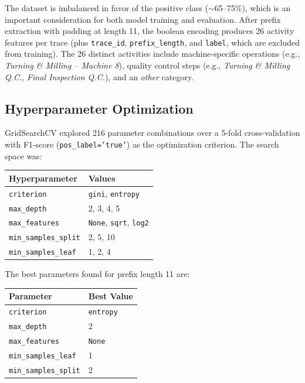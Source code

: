 \documentclass{article}
\begin{document}
\noindent
The dataset is imbalanced in favor of the positive class ($\sim$65--75\%), which is an important consideration for both model training and evaluation. After prefix extraction with padding at length 11, the boolean encoding produces 26 activity features per trace (plus \texttt{trace\_id}, \texttt{prefix\_length}, and \texttt{label}, which are excluded from training). The 26 distinct activities include machine-specific operations (e.g., \textit{Turning \& Milling -- Machine 8}), quality control steps (e.g., \textit{Turning \& Milling Q.C.}, \textit{Final Inspection Q.C.}), and an \textit{other} category.

\subsection{Hyperparameter Optimization}

GridSearchCV explored 216 parameter combinations over a 5-fold cross-validation with F1-score (\texttt{pos\_label='true'}) as the optimization criterion. The search space was:

\begin{center}
\begin{tabular}{ll}
\toprule
\textbf{Hyperparameter}        & \textbf{Values} \\
\midrule
\texttt{criterion}             & \texttt{gini}, \texttt{entropy} \\
\texttt{max\_depth}            & 2, 3, 4, 5 \\
\texttt{max\_features}         & \texttt{None}, \texttt{sqrt}, \texttt{log2} \\
\texttt{min\_samples\_split}   & 2, 5, 10 \\
\texttt{min\_samples\_leaf}    & 1, 2, 4 \\
\bottomrule
\end{tabular}
\end{center}

\noindent
The best parameters found for prefix length 11 are:

\begin{center}
\begin{tabular}{ll}
\toprule
\textbf{Parameter}             & \textbf{Best Value} \\
\midrule
\texttt{criterion}             & \texttt{entropy} \\
\texttt{max\_depth}            & 2 \\
\texttt{max\_features}         & \texttt{None} \\
\texttt{min\_samples\_leaf}    & 1 \\
\texttt{min\_samples\_split}   & 2 \\
\bottomrule
\end{tabular}
\end{center}
\end{document}
